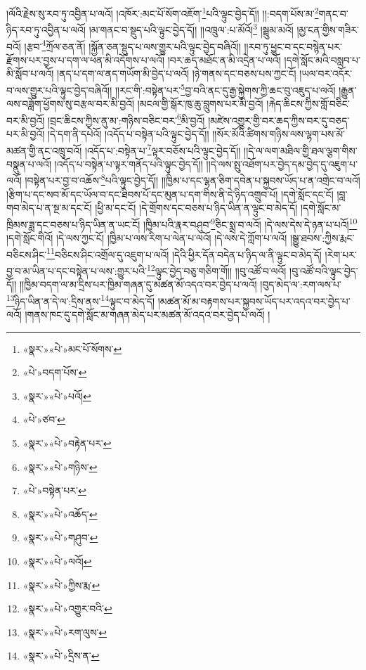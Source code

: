 །ལོའི་རྗེས་སུ་རབ་ཏུ་འབྱིན་པ་ལའོ། །འཁོར་:མང་པོ་སོག་འཇོག་\footnote{«སྣར་»«པེ་»མང་པོ་སོགས་}པའི་ལྟུང་བྱེད་དོ།། །།:བདག་པོས་མ་\footnote{«པེ་»བདག་པོས་}གནང་བ་ཉིད་རབ་ཏུ་འབྱིན་པ་ལའོ། །མ་གནང་བ་སྡུད་པའི་ལྟུང་བྱེད་དོ།། །།འཁྲུལ་:པ་མོའོ།\footnote{«སྣར་»«པེ་»པའོ།} །སྦྲུམ་མའོ། །མྱ་ངན་གྱིས་གཟིར་བའོ། །རྩབ་\footnote{«པེ་»ཙབ་}ཀྲོལ་ཅན་ནོ། །སྐྱོན་ཅན་སྡུད་པ་ལས་གྱུར་པའི་ལྟུང་བྱེད་བཞིའོ།། །།རབ་ཏུ་ཕྱུང་བ་དང་བསྙེན་པར་རྫོགས་པར་བྱས་པ་དག་ལ་ཕན་མི་འདོགས་པ་ལའོ། །བར་ཆད་མཐོང་ན་མི་འདྲེན་པ་ལའོ། །དགེ་སློང་མའི་བསླབ་པ་མི་སློབ་པ་ལའོ། །ནད་པ་དག་ལ་ནད་གཡོག་མི་བྱེད་པ་ལའོ། །ཉེ་གནས་དང་བཅས་པས་ཀྱང་ངོ། །ཡལ་བར་འདོར་བ་ལས་གྱུར་པའི་ལྟུང་བྱེད་བཞིའོ།། །།རང་གི་:བསྟེན་པར་\footnote{«སྣར་»«པེ་»བརྟེན་པར་}བྱ་བའི་ནང་དུ་རྒྱ་སྐྱེགས་ཀྱི་ཆང་བུ་འཇུད་པ་ལའོ། །རྒྱུན་ལས་བཟློག་ཕྱོགས་སུ་བརྩལ་བར་མི་བྱའོ། །མངལ་གྱི་སྒོར་ཁུ་ཆུ་བླུགས་པར་མི་བྱའོ། །རྐེད་ཆིངས་ཀྱིས་གློ་བཅིང་བར་མི་བྱའོ། །བྲང་ཆིངས་ཀྱིས་ནུ་མ་:གཉིས་བཅིང་བར་\footnote{«སྣར་»«པེ་»གཉིས་}མི་བྱའོ། །མཛེས་འགྱུར་གྱི་བར་ཆད་ཀྱིས་བར་དུ་བཅད་པར་མི་བྱའོ། །དེ་དག་ནི་དཔེའོ། །འདོད་པ་བསྟེན་པའི་ལྟུང་བྱེད་དོ།། །།སོར་མོའི་ཚིགས་གཉིས་ལས་ལྷག་པས་མོ་མཚན་གྱི་ནང་འཁྲུ་བའོ། །འདོད་པ་:བསྟེན་པ་\footnote{«པེ་»བསྟེན་པར་}ལྟར་བཅོས་པའི་ལྟུང་བྱེད་དོ།། །།དེ་ལ་ལག་མཐིལ་གྱི་ཐལ་ལྕག་གིས་བསྣུན་པ་ལའོ། །འདོད་པ་བསྟེན་པ་ལྟར་གནོད་པའི་ལྟུང་བྱེད་དོ།། །།དེ་ལས་སྤུ་འཐོག་པར་བྱེད་དམ་བྱེད་དུ་འཇུག་པ་ལའོ། །བསྟེན་པར་བྱ་བ་འཆོས་\footnote{«སྣར་»«པེ་»འཆོད་}པའི་ལྟུང་བྱེད་དོ།། །།ཁྱིམ་པ་དང་ལྷན་ཅིག་དབེན་པ་སྐྱབས་ཡོད་པ་ན་འགྲེང་བ་ལའོ། །རྩིག་པ་དང་སབ་མོ་དང་ཡོལ་བ་དང་ཐིབས་པོ་དང་མུན་པ་དག་གིས་ནི་དེ་ཉིད་འགྲུབ་པོ། །དགེ་སློང་དང་ངོ། །བླ་གབ་མེད་པ་ན་སྔ་མ་དང་ངོ། །ཕྱི་མ་དང་ངོ། །དེ་གྲོགས་དང་བཅས་པ་ཉིད་ཡིན་ན་ལྟུང་བ་མེད་དོ། །དགེ་སློང་མ་ཁྲིམས་ཟླ་དང་བཅས་པ་ཉིད་ཡིན་ན་ཡང་ངོ། །ཁྱིམ་པའི་རྣར་བཤུབ་\footnote{«སྣར་»«པེ་»གཤུབ་}ཅིང་སྨྲ་བ་ལའོ། །དེ་ལས་དེས་དེ་ཉན་པ་པའོ།\footnote{«སྣར་»«པེ་»ལའོ།} །དགེ་སློང་གིའོ། །དེ་ལས་ཀྱང་ངོ། །ཁྱིམ་པ་ལས་རིག་པ་ལེན་པ་ལའོ། །དེ་ལས་དེ་ཀློག་པ་ལའོ། །སྒྱུ་ཐབས་:ཀྱིས་རྨང་བཅིངས་ཤིང་\footnote{«སྣར་»«པེ་»ཀྱིས་རྨ་}བཅིངས་ཤིང་འགྲོལ་དུ་འཇུག་པ་ལའོ། །དེའི་ཕྱིར་དོན་བདེན་པ་ཉིད་ལ་ནི་ལྟུང་བ་མེད་དོ། །རེག་པར་བྱ་བ་མ་ཡིན་པ་དང་བསྟེན་པ་ལས་:གྱུར་པའི་\footnote{«སྣར་»«པེ་»འགྱུར་བའི་}ལྟུང་བྱེད་བཅུ་གཅིག་གོ།། །།བུ་འཚོ་བ་ལའོ། །བུ་འཚོ་བའི་ལྟུང་བྱེད་དོ།། །།ཁྱིམ་བདག་ལ་མ་དྲིས་པར་ཁྱིམ་གཞན་དུ་མཚན་མོ་འདའ་བར་བྱེད་པ་ལའོ། །བུད་མེད་ལ་:རག་ལས་པ་\footnote{«སྣར་»«པེ་»རག་ལུས་}ཉིད་ཡིན་ན་དེ་ལ་:དྲིས་ནས་\footnote{«སྣར་»«པེ་»དྲིས་ན་}ལྟུང་བ་མེད་དོ། །མཚན་མོ་མ་བརྟགས་པར་སྐྱབས་ཡོད་པར་འདའ་བར་བྱེད་པ་ལའོ། །གནས་ཁང་དུ་དགེ་སློང་མ་གཞན་མེད་པར་མཚན་མོ་འདའ་བར་བྱེད་པ་ལའོ། །
